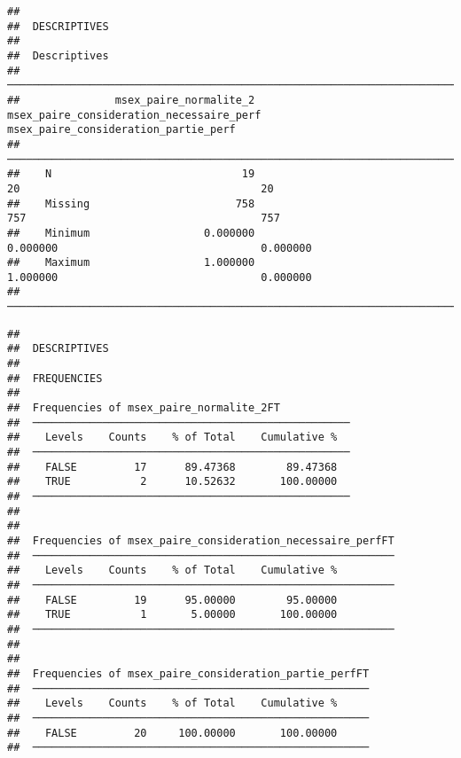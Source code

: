 \documentclass[
]{article}
\begin{document}
\begin{verbatim}
## 
##  DESCRIPTIVES
## 
##  Descriptives                                                                                                              
##  ───────────────────────────────────────────────────────────────────────────────────────────────────────────────────────── 
##               msex_paire_normalite_2    msex_paire_consideration_necessaire_perf    msex_paire_consideration_partie_perf   
##  ───────────────────────────────────────────────────────────────────────────────────────────────────────────────────────── 
##    N                              19                                          20                                      20   
##    Missing                       758                                         757                                     757   
##    Minimum                  0.000000                                    0.000000                                0.000000   
##    Maximum                  1.000000                                    1.000000                                0.000000   
##  ─────────────────────────────────────────────────────────────────────────────────────────────────────────────────────────
\end{verbatim}

\begin{verbatim}
## 
##  DESCRIPTIVES
## 
##  FREQUENCIES
## 
##  Frequencies of msex_paire_normalite_2FT            
##  ────────────────────────────────────────────────── 
##    Levels    Counts    % of Total    Cumulative %   
##  ────────────────────────────────────────────────── 
##    FALSE         17      89.47368        89.47368   
##    TRUE           2      10.52632       100.00000   
##  ────────────────────────────────────────────────── 
## 
## 
##  Frequencies of msex_paire_consideration_necessaire_perfFT 
##  ───────────────────────────────────────────────────────── 
##    Levels    Counts    % of Total    Cumulative %   
##  ───────────────────────────────────────────────────────── 
##    FALSE         19      95.00000        95.00000   
##    TRUE           1       5.00000       100.00000   
##  ───────────────────────────────────────────────────────── 
## 
## 
##  Frequencies of msex_paire_consideration_partie_perfFT 
##  ───────────────────────────────────────────────────── 
##    Levels    Counts    % of Total    Cumulative %   
##  ───────────────────────────────────────────────────── 
##    FALSE         20     100.00000       100.00000   
##  ─────────────────────────────────────────────────────
\end{verbatim}
\end{document}
